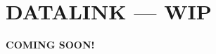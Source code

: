 \section{DATALINK --- WIP}

\vspace{\textheight/(3)}
\begin{center}
    \Large\titlefont\textbf{COMING SOON!}
\end{center}